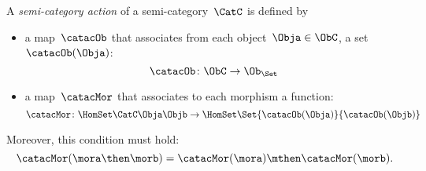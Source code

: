 \begin{ctdefinition}
    \label{def:semicategory-action}
    A \emph{semi-category action} of a semi-category~$\CatC$ is defined by
    \begin{itemize}
        \item a map~$\catacOb$ that associates from each object~$\Obja \in \ObC$, a set~$\catacOb(\Obja)$:
        \begin{equation}
            \catacOb \colon \ObC \to \Ob_\Set
        \end{equation}
        \item a map~$\catacMor$ that associates to each morphism a function:
        \begin{equation}
            \catacMor\colon \HomSet\CatC\Obja\Objb \to  \HomSet\Set{\catacOb(\Obja)}{\catacOb(\Objb) }
        \end{equation}
    \end{itemize}
    Moreover, this condition must hold:
    \begin{equation}
        \catacMor(\mora\then\morb) = \catacMor(\mora) \mthen \catacMor(\morb).
    \end{equation}
\end{ctdefinition}

